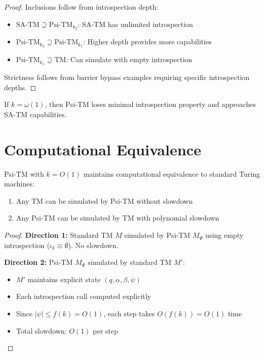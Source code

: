 \documentclass[11pt]{article}
\begin{document}
\begin{proof}
Inclusions follow from introspection depth:
\begin{itemize}
\item $\text{SA-TM} \supseteq \text{Psi-TM}_{k_2}$: SA-TM has unlimited introspection
\item $\text{Psi-TM}_{k_2} \supseteq \text{Psi-TM}_{k_1}$: Higher depth provides more capabilities  
\item $\text{Psi-TM}_{k_1} \supseteq \text{TM}$: Can simulate with empty introspection
\end{itemize}
Strictness follows from barrier bypass examples requiring specific introspection depths.
\end{proof}

\begin{corollary}
If $k = \omega(1)$, then Psi-TM loses minimal introspection property and approaches SA-TM capabilities.
\end{corollary}

\section{Computational Equivalence}

\begin{theorem}
\label{thm:equivalence}
Psi-TM with $k = O(1)$ maintains computational equivalence to standard Turing machines:
\begin{enumerate}
\item Any TM can be simulated by Psi-TM without slowdown
\item Any Psi-TM can be simulated by TM with polynomial slowdown
\end{enumerate}
\end{theorem}

\begin{proof}
\textbf{Direction 1:} Standard TM $M$ simulated by Psi-TM $M_\Psi$ using empty introspection ($\iota_k \equiv \emptyset$). No slowdown.

\textbf{Direction 2:} Psi-TM $M_\Psi$ simulated by standard TM $M'$:
\begin{itemize}
\item $M'$ maintains explicit state $(q, \alpha, \beta, \psi)$ 
\item Each introspection call computed explicitly
\item Since $|\psi| \leq f(k) = O(1)$, each step takes $O(f(k)) = O(1)$ time
\item Total slowdown: $O(1)$ per step
\end{itemize}
\end{proof}
\end{document}
